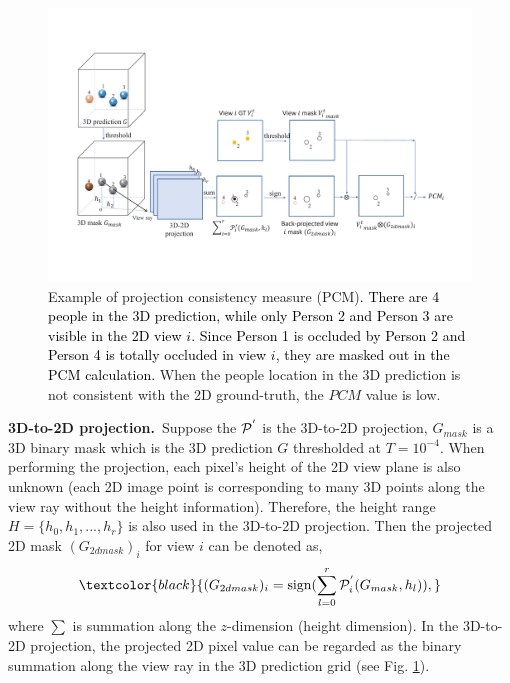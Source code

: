 \documentclass[letterpaper]{article} %
\DeclareMathOperator{\sign}{sign}
\newcommand{\NOTE}[1]{\textcolor{black}{}}
\newcommand{\zq}[1]{\textcolor{black}{#1}} %
\newcommand{\ZQ}[1]{\textcolor{black}{}} %
\begin{document}
\begin{figure}[t]
\centering
   \includegraphics[width=0.95\columnwidth]{Fig_pcm.pdf}
   \caption{Example of projection consistency measure (PCM). \zq{There are 4 people in the 3D prediction, while only Person 2 and Person 3 are visible in the 2D view $i$. Since Person 1 is occluded by Person 2 and Person 4 is totally occluded in view $i$, they are masked out in the PCM calculation.} When the people location in the 3D prediction is not consistent with the 2D ground-truth, the $PCM$ value is low.
   }
\label{fig:pcm}
\end{figure}


\textbf{3D-to-2D projection.}~Suppose the $\cal P^{'}$ is the 3D-to-2D projection, $G_{mask}$ is a 3D binary mask which is the 3D prediction $G$ thresholded at $T=10^{-4}$. When performing the projection, each pixel's height of the 2D view plane is also unknown (each 2D image point is corresponding to many 3D points along the view ray without the height information). Therefore, the height range $H = \{h_0, h_1, ..., h_r\}$ is also used in the 3D-to-2D projection. Then the projected 2D mask $(G_{2dmask})_{i}$ for view $i$ can be denoted as,
\begin{align}
      \zq{(G_{2dmask})_{i}  = \sign(\sum^r_{l=0}{\cal P}^{'}_i (G_{mask}, h_l)),}
\end{align}
where $\sum$ is summation along the $z$-dimension (height dimension). In the 3D-to-2D projection, the projected 2D pixel value can be regarded as the binary summation along the view ray in the 3D prediction grid (see Fig. \ref{fig:pcm}).
\end{document}
